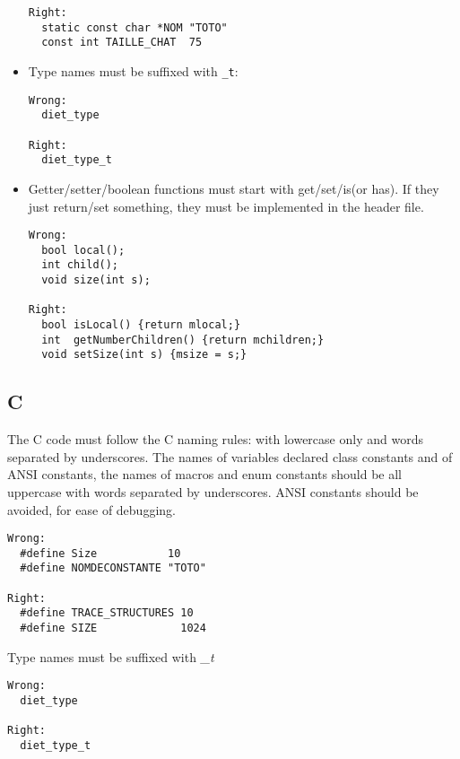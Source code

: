 \documentclass{article}
\begin{document}
\begin{itemize}
\begin{verbatim}
Right:
  static const char *NOM "TOTO"
  const int TAILLE_CHAT  75
\end{verbatim}

\item Type names must be suffixed with \texttt{\_t}: \\
\begin{verbatim}
Wrong:
  diet_type

Right:
  diet_type_t
\end{verbatim}
\item Getter/setter/boolean functions must start with get/set/is(or has).
If they just return/set something, they must be implemented in the header
file.
\begin{verbatim}
Wrong:
  bool local();
  int child();
  void size(int s);

Right:
  bool isLocal() {return mlocal;} 
  int  getNumberChildren() {return mchildren;}
  void setSize(int s) {msize = s;}
\end{verbatim}

\end{itemize}

\subsection{C}
The C code must follow the C naming rules:
 with lowercase only and words separated by underscores.
The names of variables declared class constants and of ANSI constants,
 the names of macros and enum constants should be all uppercase with words
 separated by underscores. ANSI constants should be avoided, for ease of
 debugging.
\begin{verbatim}
Wrong:
  #define Size           10
  #define NOMDECONSTANTE "TOTO"

Right:
  #define TRACE_STRUCTURES 10
  #define SIZE             1024
\end{verbatim}

Type names must be suffixed with \textit{\_t}
\begin{verbatim}
Wrong:
  diet_type

Right:
  diet_type_t
\end{verbatim}
\end{document}
